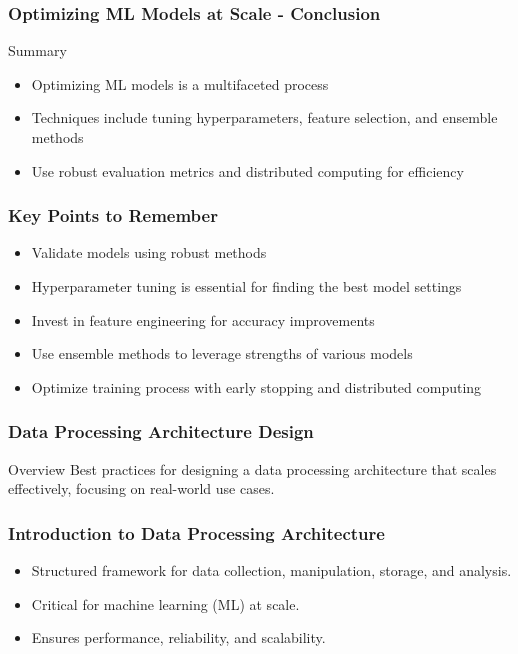 \documentclass[aspectratio=169]{beamer}
\begin{document}
\begin{frame}[fragile]
    \frametitle{Optimizing ML Models at Scale - Conclusion}
    \begin{block}{Summary}
        \begin{itemize}
            \item Optimizing ML models is a multifaceted process
            \item Techniques include tuning hyperparameters, feature selection, and ensemble methods
            \item Use robust evaluation metrics and distributed computing for efficiency
        \end{itemize}
    \end{block}
\end{frame}

\begin{frame}[fragile]
    \frametitle{Key Points to Remember}
    \begin{itemize}
        \item Validate models using robust methods
        \item Hyperparameter tuning is essential for finding the best model settings
        \item Invest in feature engineering for accuracy improvements
        \item Use ensemble methods to leverage strengths of various models
        \item Optimize training process with early stopping and distributed computing
    \end{itemize}
\end{frame}

\begin{frame}
    \frametitle{Data Processing Architecture Design}
    \begin{block}{Overview}
        Best practices for designing a data processing architecture that scales effectively, focusing on real-world use cases.
    \end{block}
\end{frame}

\begin{frame}
    \frametitle{Introduction to Data Processing Architecture}
    \begin{itemize}
        \item Structured framework for data collection, manipulation, storage, and analysis.
        \item Critical for machine learning (ML) at scale.
        \item Ensures performance, reliability, and scalability.
    \end{itemize}
\end{frame}
\end{document}
